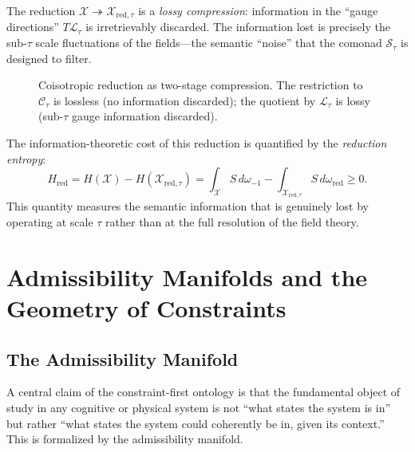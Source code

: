 \documentclass[a4paper,12pt]{article}
\theoremstyle{definition}
\newcommand{\Stau}{\mathcal{S}_\tau}
\newcommand{\Xred}{\mathcal{X}_{\mathrm{red},\tau}}
\newcommand{\Ctau}{\mathcal{C}_\tau}
\newcommand{\X}{\mathcal{X}}
\begin{document}
The reduction $\X \twoheadrightarrow \Xred$ is a \emph{lossy compression}: information in the ``gauge directions'' $T\mathcal{L}_\tau$ is irretrievably discarded. The information lost is precisely the sub-$\tau$ scale fluctuations of the fields—the semantic ``noise'' that the comonad $\Stau$ is designed to filter.

\begin{figure}[h]
\centering
{}
\caption{Coisotropic reduction as two-stage compression. The restriction to $\Ctau$ is lossless (no information discarded); the quotient by $\mathcal{L}_\tau$ is lossy (sub-$\tau$ gauge information discarded).}
\label{fig:reduction}
\end{figure}

The information-theoretic cost of this reduction is quantified by the \emph{reduction entropy}:
\[
H_{\mathrm{red}} = H(\X) - H(\Xred) = \int_\X S \, d\omega_{-1} - \int_{\Xred} S \, d\omega_{\mathrm{red}} \geq 0.
\]
This quantity measures the semantic information that is genuinely lost by operating at scale $\tau$ rather than at the full resolution of the field theory.

\section{Admissibility Manifolds and the Geometry of Constraints}
\label{sec:admissibility}

\subsection{The Admissibility Manifold}

A central claim of the constraint-first ontology is that the fundamental object of study in any cognitive or physical system is not ``what states the system is in'' but rather ``what states the system could coherently be in, given its context.'' This is formalized by the admissibility manifold.
\end{document}
